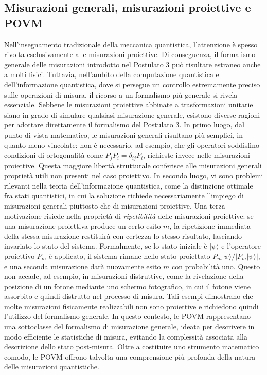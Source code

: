 \documentclass[a4paper,12pt]{report}
\theoremstyle{plain}
\begin{document}
\subsection*{Misurazioni generali, misurazioni proiettive e POVM}
Nell'insegnamento tradizionale della meccanica quantistica, l'attenzione è spesso rivolta esclusivamente alle misurazioni proiettive. Di conseguenza, il formalismo generale delle misurazioni introdotto nel Postulato 3 può risultare estraneo anche a molti fisici. Tuttavia, nell'ambito della computazione quantistica e dell'informazione quantistica, dove si persegue un controllo estremamente preciso sulle operazioni di misura, il ricorso a un formalismo più generale si rivela essenziale.
Sebbene le misurazioni proiettive abbinate a trasformazioni unitarie siano in grado di simulare qualsiasi misurazione generale, esistono diverse ragioni per adottare direttamente il formalismo del Postulato 3. In primo luogo, dal punto di vista matematico, le misurazioni generali risultano più semplici, in quanto meno vincolate: non è necessario, ad esempio, che gli operatori soddisfino condizioni di ortogonalità come $P_j P_i = \delta_{ij} P_i$, richieste invece nelle misurazioni proiettive. Questa maggiore libertà strutturale conferisce alle misurazioni generali proprietà utili non presenti nel caso proiettivo.
In secondo luogo, vi sono problemi rilevanti nella teoria dell'informazione quantistica, come la distinzione ottimale fra stati quantistici, in cui la soluzione richiede necessariamente l'impiego di misurazioni generali piuttosto che di misurazioni proiettive.
Una terza motivazione risiede nella proprietà di \textit{ripetibilità} delle misurazioni proiettive: se una misurazione proiettiva produce un certo esito $m$, la ripetizione immediata della stessa misurazione restituirà con certezza lo stesso risultato, lasciando invariato lo stato del sistema. Formalmente, se lo stato iniziale è $|\psi\rangle$ e l'operatore proiettivo $P_m$ è applicato, il sistema rimane nello stato proiettato $P_m|\psi\rangle / |P_m|\psi\rangle|$, e una seconda misurazione darà nuovamente esito $m$ con probabilità uno. Questo non accade, ad esempio, in misurazioni distruttive, come la rivelazione della posizione di un fotone mediante uno schermo fotografico, in cui il fotone viene assorbito e quindi distrutto nel processo di misura.
Tali esempi dimostrano che molte misurazioni fisicamente realizzabili non sono proiettive e richiedono quindi l'utilizzo del formalismo generale. In questo contesto, le POVM rappresentano una sottoclasse del formalismo di misurazione generale, ideata per descrivere in modo efficiente le statistiche di misura, evitando la complessità associata alla descrizione dello stato post-misura. Oltre a costituire uno strumento matematico comodo, le POVM offrono talvolta una comprensione più profonda della natura delle misurazioni quantistiche.
\end{document}
